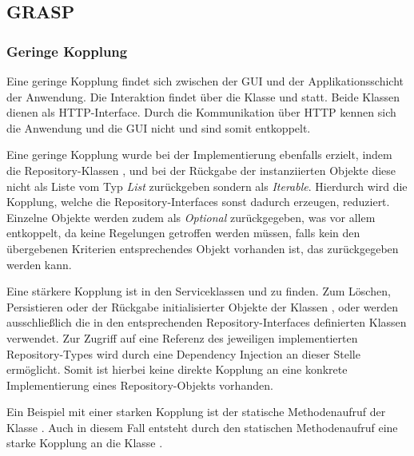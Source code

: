 
\subsection{\ac{GRASP}}

\subsubsection*{Geringe Kopplung}
Eine geringe Kopplung findet sich zwischen der \ac{GUI} und der Applikationsschicht der Anwendung.
Die Interaktion findet über die Klasse \href{}{\code{}} und \href{}{\code{}} statt.
Beide Klassen dienen als \ac{HTTP}-Interface.
Durch die Kommunikation über \ac{HTTP} kennen sich die Anwendung und die \ac{GUI} nicht und sind somit entkoppelt.

Eine geringe Kopplung wurde bei der Implementierung ebenfalls erzielt, indem die Repository-Klassen \href{}{\code{}}, \href{}{\code{}} und \href{}{\code{}} bei der Rückgabe der instanziierten Objekte diese nicht als Liste vom Typ \textit{List} zurückgeben sondern als \textit{Iterable}.
Hierdurch wird die Kopplung, welche die Repository-Interfaces sonst dadurch erzeugen, reduziert.
Einzelne Objekte werden zudem als \textit{Optional} zurückgegeben, was vor allem entkoppelt, da keine Regelungen getroffen werden müssen, falls kein den übergebenen Kriterien entsprechendes Objekt vorhanden ist, das zurückgegeben werden kann.

Eine stärkere Kopplung ist in den Serviceklassen \href{}{\code{}} und \href{}{\code{}} zu finden.
Zum Löschen, Persistieren oder der Rückgabe initialisierter Objekte der Klassen \href{}{\code{}}, \href{}{\code{}} oder \href{}{\code{}} werden ausschließlich die in den entsprechenden Repository-Interfaces definierten Klassen verwendet.
Zur Zugriff auf eine Referenz des jeweiligen implementierten Repository-Types wird durch eine \href{}{\code{}}Dependency Injection an dieser Stelle ermöglicht.
Somit ist hierbei keine direkte Kopplung an eine konkrete Implementierung eines Repository-Objekts vorhanden.

Ein Beispiel mit einer starken Kopplung ist der statische Methodenaufruf \href{}{\code{}} der Klasse .
Auch in diesem Fall entsteht durch den statischen Methodenaufruf eine starke Kopplung an die Klasse \href{}{\code{}}.

